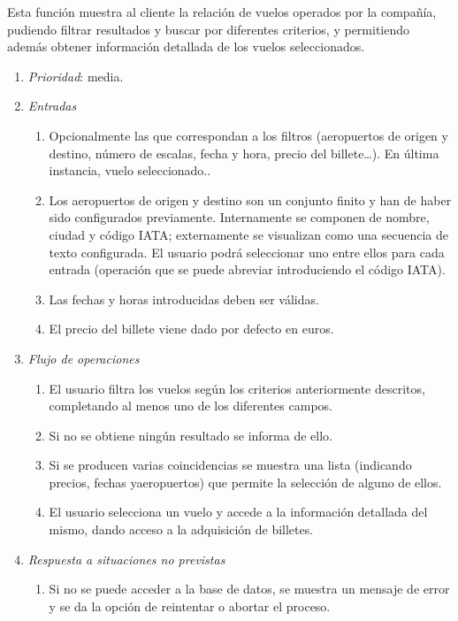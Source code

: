 
	Esta función muestra al cliente la relación de vuelos operados por la compañía, pudiendo filtrar resultados y buscar por diferentes criterios, y permitiendo además obtener información detallada de los vuelos seleccionados.
	
	\begin{enumerate}
		\item \textit{Prioridad}: media.
		\item \textit{Entradas}
		\begin{enumerate}
			\item Opcionalmente las que correspondan a los filtros (aeropuertos de origen y destino, número de escalas, fecha y hora, precio del billete\ldots). En última instancia, vuelo seleccionado..
			\item Los aeropuertos de origen y destino son un conjunto finito y han de haber sido configurados previamente. Internamente se componen de nombre, ciudad y código \gls{IATA}; externamente se visualizan como una secuencia de texto configurada. El usuario podrá seleccionar uno entre ellos para cada entrada (operación que se puede abreviar introduciendo el código IATA).
			\item Las fechas y horas introducidas deben ser válidas.
			\item El precio del billete viene dado por defecto en euros.
		\end{enumerate}
		\item \textit{Flujo de operaciones}
		\begin{enumerate}
			\item El usuario filtra los vuelos según los criterios anteriormente descritos, completando al menos uno de los diferentes campos.
			\item Si no se obtiene ningún resultado se informa de ello. 
			\item Si se producen varias coincidencias se muestra una lista (indicando precios, fechas y\break aeropuertos) que permite la selección de alguno de ellos.
			\item El usuario selecciona un vuelo y accede a la información detallada del mismo, dando acceso a la adquisición de billetes.
		\end{enumerate}
		\item \textit{Respuesta a situaciones no previstas}
		\begin{enumerate}
			\item Si no se puede acceder a la base de datos, se muestra un mensaje de error y se da la opción de reintentar o abortar el proceso.
		\end{enumerate}
	\end{enumerate}
